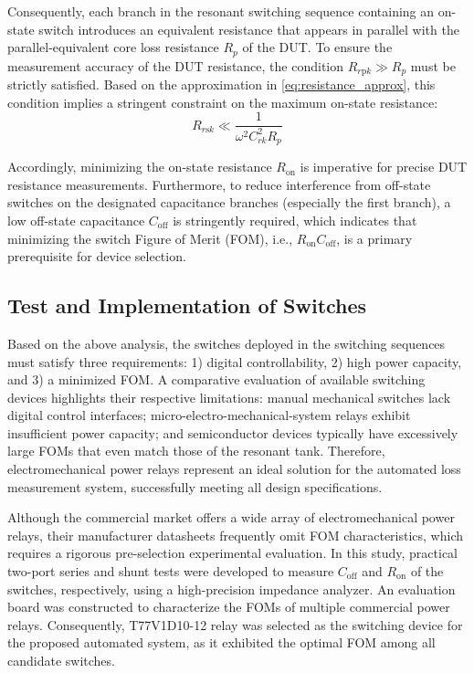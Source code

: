 \documentclass[conference]{IEEEtran}
\begin{document}
Consequently, each branch in the resonant switching sequence containing an on-state switch introduces an equivalent resistance that appears in parallel with the parallel-equivalent core loss resistance $R_p$ of the DUT. To ensure the measurement accuracy of the DUT resistance, the condition $R_{r\text{p}k} \gg R_p$ must be strictly satisfied. Based on the approximation in \eqref{eq:resistance_approx}, this condition implies a stringent constraint on the maximum on-state resistance:
\begin{equation}
\label{eq:resistance_constraint}
R_{r\text{s}k} \ll \frac{1}{\omega^2 C_{rk}^2 R_p}
\end{equation}

Accordingly, minimizing the on-state resistance $R_{\text{on}}$ is imperative for precise DUT resistance measurements. Furthermore, to reduce interference from off-state switches on the designated capacitance branches (especially the first branch), a low off-state capacitance $C_{\text{off}}$ is stringently required, which indicates that minimizing the switch Figure of Merit (FOM), i.e., $R_{\text{on}}C_{\text{off}}$, is a primary prerequisite for device selection.

\subsection{Test and Implementation of Switches}

Based on the above analysis, the switches deployed in the switching sequences must satisfy three requirements: 1) digital controllability, 2) high power capacity, and 3) a minimized FOM. A comparative evaluation of available switching devices highlights their respective limitations: manual mechanical switches lack digital control interfaces; micro-electro-mechanical-system relays exhibit insufficient power capacity; and semiconductor devices typically have excessively large FOMs that even match those of the resonant tank. Therefore, electromechanical power relays represent an ideal solution for the automated loss measurement system, successfully meeting all design specifications.

Although the commercial market offers a wide array of electromechanical power relays, their manufacturer datasheets frequently omit FOM characteristics, which requires a rigorous pre-selection experimental evaluation. In this study, practical two-port series and shunt tests were developed to measure $C_{\text{off}}$ and $R_{\text{on}}$ of the switches, respectively, using a high-precision impedance analyzer. An evaluation board was constructed to characterize the FOMs of multiple commercial power relays. Consequently, T77V1D10-12 relay was selected as the switching device for the proposed automated system, as it exhibited the optimal FOM among all candidate switches. 
\end{document}
